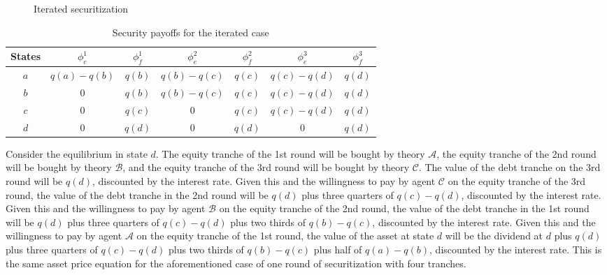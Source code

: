 \documentclass[11pt]{article}
\theoremstyle{plain}
\begin{document}
\begin{figure}[h]
\centering
{}
\caption{Iterated securitization}
\label{fig:tree}
\end{figure}

\begin{table}
\caption{Security payoffs for the iterated case}
\label{tab:pit}
\centering
\begin{tabular}{ c | c c | c c | c c }
\hline
States & $\phi^1_e$ & $\phi^1_f$ & $\phi^2_e$ & $\phi^2_f$ & $\phi^3_e$ & $\phi^3_f$ \\
\hline
$a$ & $q(a)-q(b)$ & $q(b)$ & $q(b)-q(c)$ & $q(c)$ & $q(c)-q(d)$ & $q(d)$ \\
$b$ & $0$         & $q(b)$ & $q(b)-q(c)$ & $q(c)$ & $q(c)-q(d)$ & $q(d)$ \\
$c$ & $0$         & $q(c)$ & $0$         & $q(c)$ & $q(c)-q(d)$ & $q(d)$ \\
$d$ & $0$         & $q(d)$ & $0$         & $q(d)$ & $0$         & $q(d)$ \\
 \hline
\end{tabular}
\end{table}

Consider the equilibrium in state $d$. The equity tranche of the 1st round will be bought by theory $\mathcal{A}$, the equity tranche of the 2nd round will be bought by theory $\mathcal{B}$, and the equity tranche of the 3rd round will be bought by theory $\mathcal{C}$. The value of the debt tranche on the 3rd round will be $q(d)$, discounted by the interest rate. Given this and the willingness to pay by agent $\mathcal{C}$ on the equity tranche of the 3rd round, the value of the debt tranche in the 2nd round will be $q(d)$ plus three quarters of $q(c)-q(d)$, discounted by the interest rate. Given this and the willingness to pay by agent $\mathcal{B}$ on the equity tranche of the 2nd round, the value of the debt tranche in the 1st round will be $q(d)$ plus three quarters of $q(c)-q(d)$ plus two thirds of $q(b)-q(c)$, discounted by the interest rate. Given this and the willingness to pay by agent $\mathcal{A}$ on the equity tranche of the 1st round, the value of the asset at state $d$ will be the dividend at $d$ plus $q(d)$ plus three quarters of $q(c)-q(d)$ plus two thirds of $q(b)-q(c)$ plus half of $q(a)-q(b)$, discounted by the interest rate. This is the same asset price equation for the aforementioned case of one round of securitization with four tranches.
\end{document}
